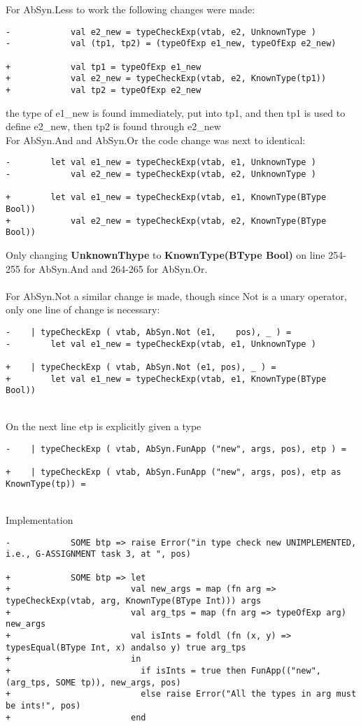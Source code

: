 For AbSyn.Less to work the following changes were made:
\begin{verbatim}
-            val e2_new = typeCheckExp(vtab, e2, UnknownType )
-            val (tp1, tp2) = (typeOfExp e1_new, typeOfExp e2_new)

+            val tp1 = typeOfExp e1_new
+            val e2_new = typeCheckExp(vtab, e2, KnownType(tp1))
+            val tp2 = typeOfExp e2_new 
\end{verbatim}
the type of e1\_new is found immediately, put into tp1, and then tp1 is used to
define e2\_new, then tp2 is found through e2\_new
\\
For AbSyn.And and AbSyn.Or the code change was next to identical:
\begin{verbatim}
-        let val e1_new = typeCheckExp(vtab, e1, UnknownType )
-            val e2_new = typeCheckExp(vtab, e2, UnknownType )

+        let val e1_new = typeCheckExp(vtab, e1, KnownType(BType Bool))
+            val e2_new = typeCheckExp(vtab, e2, KnownType(BType Bool))
\end{verbatim}
Only changing \textbf{UnknownThype} to \textbf{KnownType(BType Bool)} on line
254-255 for AbSyn.And and 264-265 for AbSyn.Or.\\
\\
For AbSyn.Not a similar change is made, though since Not is a unary operator,
only one line of change is necessary:
\begin{verbatim}
-    | typeCheckExp ( vtab, AbSyn.Not (e1,    pos), _ ) =
-        let val e1_new = typeCheckExp(vtab, e1, UnknownType )

+    | typeCheckExp ( vtab, AbSyn.Not (e1, pos), _ ) =
+        let val e1_new = typeCheckExp(vtab, e1, KnownType(BType Bool))
\end{verbatim}
\\
On the next line etp is explicitly given a type
\begin{verbatim}
-    | typeCheckExp ( vtab, AbSyn.FunApp ("new", args, pos), etp ) =

+    | typeCheckExp ( vtab, AbSyn.FunApp ("new", args, pos), etp as KnownType(tp)) =
\end{verbatim}
\\
Implementation 
\begin{verbatim}
-            SOME btp => raise Error("in type check new UNIMPLEMENTED, i.e., G-ASSIGNMENT task 3, at ", pos)

+            SOME btp => let
+                        val new_args = map (fn arg => typeCheckExp(vtab, arg, KnownType(BType Int))) args
+                        val arg_tps = map (fn arg => typeOfExp arg) new_args
+                        val isInts = foldl (fn (x, y) => typesEqual(BType Int, x) andalso y) true arg_tps 
+                        in
+                          if isInts = true then FunApp(("new", (arg_tps, SOME tp)), new_args, pos)
+                          else raise Error("All the types in arg must be ints!", pos)
+                        end
\end{verbatim}
